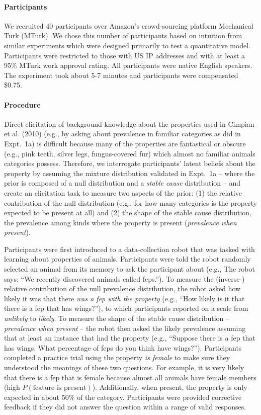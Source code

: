 \documentclass[floatsintext,doc]{apa6}
\let\oldparagraph\paragraph
\renewcommand{\paragraph}[1]{\oldparagraph{#1}\mbox{}}
\begin{document}
\paragraph{Participants}
We recruited 40 participants over Amazon's crowd-sourcing platform
Mechanical Turk (MTurk). We chose this number of participants based on
intuition from similar experiments which were designed primarily to test
a quantitative model. Participants were restricted to those with US IP
addresses and with at least a 95\% MTurk work approval rating. All
participants were native English speakers. The experiment took about 5-7
minutes and participants were compensated \$0.75.

\paragraph{Procedure}
Direct elicitation of background knowledge about the properties used in Cimpian et al. (2010) (e.g., by asking about prevalence in familiar
categories as did in Expt.~1a) is difficult because many of the properties are fantastical or obscure (e.g., pink teeth, silver legs, fungus-covered fur) which almost no familiar animals categories possess. 
Therefore,  we interrogate participants' latent beliefs about the property by assuming the mixture distribution validated in Expt.~1a -- where the prior is composed of a null distribution and a  \emph{stable cause} distribution -- and create an elicitation task to measure two aspects of the prior: (1) the relative contribution of the null distribution (e.g., for how many categories is the
property expected to be present at all) and (2) the shape of the stable cause distribution, the prevalence among
kinds where the property is present (\emph{prevalence when present}).

Participants were first introduced to a data-collection robot that was tasked with learning about properties of animals. Participants
were told the robot randomly selected an animal from its memory to ask
the participant about (e.g., The robot says: \enquote{We recently
discovered animals called feps.}). To measure the (inverse-) relative contribution
of the null prevalence distribution, the robot asked how likely it was
that there \emph{was a fep with the property} (e.g., \enquote{How likely is
it that there is a fep that has wings?}), to which participants reported
on a scale from \emph{unlikely} to \emph{likely}. To measure the shape of the stable cause distribution -- \emph{prevalence when present} -- the robot then asked the likely
prevalence assuming that at least an instance that had the property (e.g.,
\enquote{Suppose there is a fep that has wings. What percentage of feps
do you think have wings?}). Participants completed a practice trial
using the property \emph{is female} to make sure they understood the
meanings of these two questions. For example, it is very likely that
there is a fep that is female because almost all animals have female
members (high \(P(\text{feature is present})\)). Additionally, when
present, the property is only expected in about 50\% of the category.
Participants were provided corrective feedback if they did not answer the question within a range of valid responses.
\end{document}
